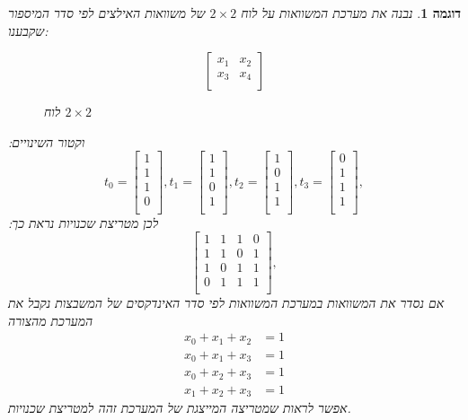 \documentclass[12pt,leqno]{article}
\theoremstyle{theoremdd}
\newtheorem{example}{דוגמה}[section]
\begin{document}
\begin{example}
    נבנה את מערכת המשוואות
    על לוח 
    $2 \times 2$
    של משוואות האילצים 
    לפי סדר המיספור שקבענו:

    \begin{figure}[ht]
        \caption{לוח 
        $2 \times 2$
        }
        \label{fig: 2 x 2 board}
        \centering
        \[
            \begin{bmatrix}
                x_1 & x_2 \\
                x_3 & x_4 \\
            \end{bmatrix}
        \]
    \end{figure}

    וקטור השינויים:
    \[
       t_0 = 
        \begin{bmatrix}
            1 \\
            1 \\
            1 \\
            0 \\
        \end{bmatrix},
        t_1 = 
        \begin{bmatrix}
            1 \\
            1 \\
            0 \\
            1 \\
        \end{bmatrix},
        t_2 = 
        \begin{bmatrix}
            1 \\
            0 \\
            1 \\
            1 \\
        \end{bmatrix},
        t_3 = 
        \begin{bmatrix}
            0 \\
            1 \\
            1 \\
            1 \\
        \end{bmatrix},
    \]
    לכן
    מטריצת שכנויות נראת כך:
    \[
        \begin{bmatrix}
            1 & 1 & 1 &0 \\
            1 & 1 & 0 & 1 \\
            1 & 0 & 1 & 1 \\
            0 & 1 & 1 & 1 \\
        \end{bmatrix},
    \]
    אם נסדר את המשוואות במערכת המשוואות לפי סדר 
    האינדקסים של המשבצות נקבל את המערכת מהצורה
    \begin{align*}
        x_0 + x_1 + x_2 &= 1\\
        x_0 + x_1 + x_3 &= 1\\
        x_0 + x_2 + x_3 &= 1\\
        x_1 + x_2 + x_3 &= 1
    \end{align*}
    אפשר לראות שמטריצה המייצגת של המערכת זהה למטריצת שכנויות.
    

\end{example}
\end{document}
